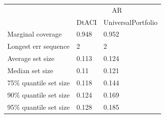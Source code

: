 \begin{tabular}{lll}
\toprule
& \multicolumn{2}{c}{AR} \\
& DtACI & UniversalPortfolio \\
\midrule
Marginal coverage & 0.948 & 0.952 \\
Longest err sequence & 2 & 2 \\
Average set size & 0.113 & 0.124 \\
Median set size & 0.11 & 0.121 \\
75\% quantile set size & 0.118 & 0.144 \\
90\% quantile set size & 0.124 & 0.169 \\
95\% quantile set size & 0.128 & 0.185 \\
\bottomrule
\end{tabular}

